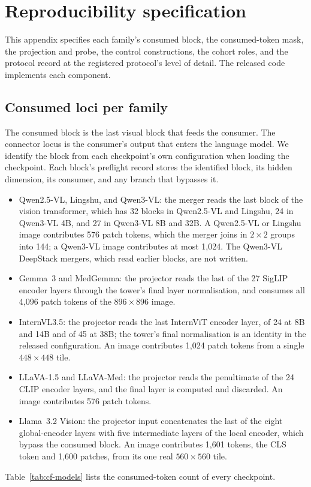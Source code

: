 \documentclass{article}
\begin{document}
\section{Reproducibility specification}
\label{app:repro}

This appendix specifies each family's consumed block, the consumed-token mask, the projection and probe, the control constructions, the cohort roles, and the protocol record at the registered protocol's level of detail. The released code implements each component.

\subsection{Consumed loci per family}
\label{app:repro-loci}

The consumed block is the last visual block that feeds the consumer. The connector locus is the consumer's output that enters the language model. We identify the block from each checkpoint's own configuration when loading the checkpoint. Each block's preflight record stores the identified block, its hidden dimension, its consumer, and any branch that bypasses it.

\begin{itemize}[leftmargin=*,itemsep=1pt,topsep=2pt]
\item Qwen2.5-VL, Lingshu, and Qwen3-VL: the merger reads the last block of the vision transformer, which has 32 blocks in Qwen2.5-VL and Lingshu, 24 in Qwen3-VL 4B, and 27 in Qwen3-VL 8B and 32B. A Qwen2.5-VL or Lingshu image contributes 576 patch tokens, which the merger joins in $2\times2$ groups into 144; a Qwen3-VL image contributes at most 1{,}024. The Qwen3-VL DeepStack mergers, which read earlier blocks, are not written.
\item Gemma~3 and MedGemma: the projector reads the last of the 27 SigLIP encoder layers through the tower's final layer normalisation, and consumes all 4{,}096 patch tokens of the $896\times896$ image.
\item InternVL3.5: the projector reads the last InternViT encoder layer, of 24 at 8B and 14B and of 45 at 38B; the tower's final normalisation is an identity in the released configuration. An image contributes 1{,}024 patch tokens from a single $448\times448$ tile.
\item LLaVA-1.5 and LLaVA-Med: the projector reads the penultimate of the 24 CLIP encoder layers, and the final layer is computed and discarded. An image contributes 576 patch tokens.
\item Llama~3.2 Vision: the projector input concatenates the last of the eight global-encoder layers with five intermediate layers of the local encoder, which bypass the consumed block. An image contributes 1{,}601 tokens, the CLS token and 1{,}600 patches, from its one real $560\times560$ tile.
\end{itemize}
Table~\ref{tab:cf-models} lists the consumed-token count of every checkpoint.
\end{document}
